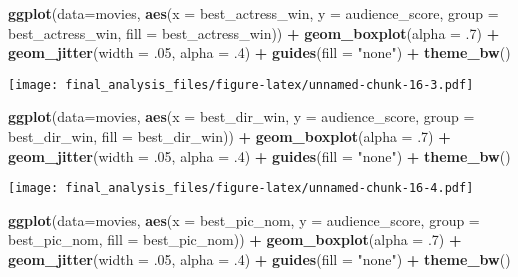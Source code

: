 \documentclass[]{article}
\newenvironment{Shaded}{\begin{snugshade}}{\end{snugshade}}
\newcommand{\DataTypeTok}[1]{\textcolor[rgb]{0.13,0.29,0.53}{#1}}
\newcommand{\FloatTok}[1]{\textcolor[rgb]{0.00,0.00,0.81}{#1}}
\newcommand{\KeywordTok}[1]{\textcolor[rgb]{0.13,0.29,0.53}{\textbf{#1}}}
\newcommand{\NormalTok}[1]{#1}
\newcommand{\OperatorTok}[1]{\textcolor[rgb]{0.81,0.36,0.00}{\textbf{#1}}}
\newcommand{\StringTok}[1]{\textcolor[rgb]{0.31,0.60,0.02}{#1}}
\begin{document}
\begin{Shaded}
\begin{Highlighting}[]
\KeywordTok{ggplot}\NormalTok{(}\DataTypeTok{data=}\NormalTok{movies, }\KeywordTok{aes}\NormalTok{(}\DataTypeTok{x =}\NormalTok{ best_actress_win, }\DataTypeTok{y =}\NormalTok{ audience_score, }\DataTypeTok{group =}\NormalTok{ best_actress_win, }\DataTypeTok{fill =}\NormalTok{ best_actress_win)) }\OperatorTok{+}\StringTok{ }\KeywordTok{geom_boxplot}\NormalTok{(}\DataTypeTok{alpha =} \FloatTok{.7}\NormalTok{) }\OperatorTok{+}\StringTok{ }\KeywordTok{geom_jitter}\NormalTok{(}\DataTypeTok{width =} \FloatTok{.05}\NormalTok{, }\DataTypeTok{alpha =} \FloatTok{.4}\NormalTok{) }\OperatorTok{+}\StringTok{ }\KeywordTok{guides}\NormalTok{(}\DataTypeTok{fill =} \StringTok{"none"}\NormalTok{) }\OperatorTok{+}\StringTok{ }\KeywordTok{theme_bw}\NormalTok{()}
\end{Highlighting}
\end{Shaded}

\texttt{[image: final\_analysis\_files/figure-latex/unnamed-chunk-16-3.pdf]}

\begin{Shaded}
\begin{Highlighting}[]
\KeywordTok{ggplot}\NormalTok{(}\DataTypeTok{data=}\NormalTok{movies, }\KeywordTok{aes}\NormalTok{(}\DataTypeTok{x =}\NormalTok{ best_dir_win, }\DataTypeTok{y =}\NormalTok{ audience_score, }\DataTypeTok{group =}\NormalTok{ best_dir_win, }\DataTypeTok{fill =}\NormalTok{ best_dir_win)) }\OperatorTok{+}\StringTok{ }\KeywordTok{geom_boxplot}\NormalTok{(}\DataTypeTok{alpha =} \FloatTok{.7}\NormalTok{) }\OperatorTok{+}\StringTok{ }\KeywordTok{geom_jitter}\NormalTok{(}\DataTypeTok{width =} \FloatTok{.05}\NormalTok{, }\DataTypeTok{alpha =} \FloatTok{.4}\NormalTok{) }\OperatorTok{+}\StringTok{ }\KeywordTok{guides}\NormalTok{(}\DataTypeTok{fill =} \StringTok{"none"}\NormalTok{) }\OperatorTok{+}\StringTok{ }\KeywordTok{theme_bw}\NormalTok{()}
\end{Highlighting}
\end{Shaded}

\texttt{[image: final\_analysis\_files/figure-latex/unnamed-chunk-16-4.pdf]}

\begin{Shaded}
\begin{Highlighting}[]
\KeywordTok{ggplot}\NormalTok{(}\DataTypeTok{data=}\NormalTok{movies, }\KeywordTok{aes}\NormalTok{(}\DataTypeTok{x =}\NormalTok{ best_pic_nom, }\DataTypeTok{y =}\NormalTok{ audience_score, }\DataTypeTok{group =}\NormalTok{ best_pic_nom, }\DataTypeTok{fill =}\NormalTok{ best_pic_nom)) }\OperatorTok{+}\StringTok{ }\KeywordTok{geom_boxplot}\NormalTok{(}\DataTypeTok{alpha =} \FloatTok{.7}\NormalTok{) }\OperatorTok{+}\StringTok{ }\KeywordTok{geom_jitter}\NormalTok{(}\DataTypeTok{width =} \FloatTok{.05}\NormalTok{, }\DataTypeTok{alpha =} \FloatTok{.4}\NormalTok{) }\OperatorTok{+}\StringTok{ }\KeywordTok{guides}\NormalTok{(}\DataTypeTok{fill =} \StringTok{"none"}\NormalTok{) }\OperatorTok{+}\StringTok{ }\KeywordTok{theme_bw}\NormalTok{()}
\end{Highlighting}
\end{Shaded}
\end{document}
